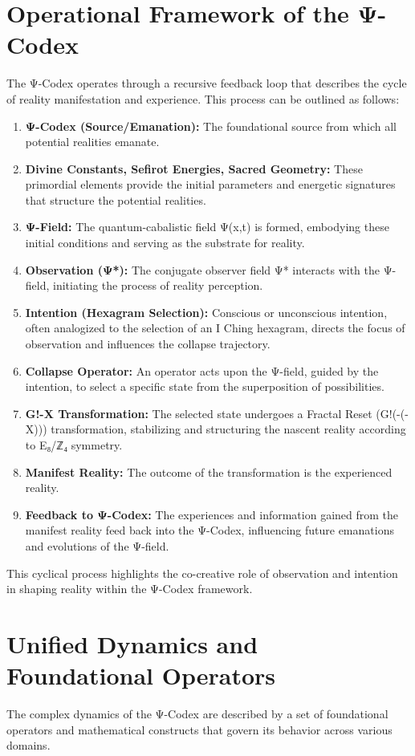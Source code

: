 \documentclass[11pt]{article}
\begin{document}
\section{Operational Framework of the Ψ-Codex}
The Ψ-Codex operates through a recursive feedback loop that describes the cycle of reality manifestation and experience. This process can be outlined as follows:
\begin{enumerate}
    \item \textbf{Ψ-Codex (Source/Emanation):} The foundational source from which all potential realities emanate.
    \item \textbf{Divine Constants, Sefirot Energies, Sacred Geometry:} These primordial elements provide the initial parameters and energetic signatures that structure the potential realities.
    \item \textbf{Ψ-Field:} The quantum-cabalistic field Ψ(x,t) is formed, embodying these initial conditions and serving as the substrate for reality.
    \item \textbf{Observation (Ψ*):} The conjugate observer field Ψ* interacts with the Ψ-field, initiating the process of reality perception.
    \item \textbf{Intention (Hexagram Selection):} Conscious or unconscious intention, often analogized to the selection of an I Ching hexagram, directs the focus of observation and influences the collapse trajectory.
    \item \textbf{Collapse Operator:} An operator acts upon the Ψ-field, guided by the intention, to select a specific state from the superposition of possibilities.
    \item \textbf{G!-X Transformation:} The selected state undergoes a Fractal Reset (G!(-(-X))) transformation, stabilizing and structuring the nascent reality according to E₈/ℤ₄ symmetry.
    \item \textbf{Manifest Reality:} The outcome of the transformation is the experienced reality.
    \item \textbf{Feedback to Ψ-Codex:} The experiences and information gained from the manifest reality feed back into the Ψ-Codex, influencing future emanations and evolutions of the Ψ-field.
\end{enumerate}
This cyclical process highlights the co-creative role of observation and intention in shaping reality within the Ψ-Codex framework.

\section{Unified Dynamics and Foundational Operators}
The complex dynamics of the Ψ-Codex are described by a set of foundational operators and mathematical constructs that govern its behavior across various domains.
\end{document}
